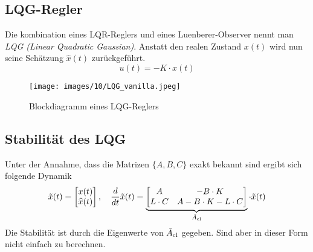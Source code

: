 \subsection{LQG-Regler}
    Die kombination eines LQR-Reglers und eines Luenberer-Observer nennt man \textit{LQG (Linear Quadratic Gaussian)}. Anstatt den realen Zustand $x(t)$ wird nun seine Schätzung $\widehat{x}(t)$ zurückgeführt.
    \begin{equation*}
        u(t) = -K\cdot\widehat{x}(t)
    \end{equation*}
    \begin{figure}[H]
        \centering
        \texttt{[image: images/10/LQG\_vanilla.jpeg]}
        \caption{Blockdiagramm eines LQG-Reglers}
    \end{figure}
    
    \noindent\begin{minipage}{\linewidth}
    \begin{center}
        
    \end{center}
    \end{minipage}
    
    
\subsection{Stabilität des LQG}
    Unter der Annahme, dass die Matrizen $\{A, B, C\}$ exakt bekannt sind ergibt sich folgende Dynamik
    \begin{equation*}
        \Tilde{x}(t) = \begin{bmatrix}x(t)\\\widehat{x}(t)\end{bmatrix},\quad
        \frac{d}{dt}\Tilde{x}(t) = 
        \underbrace{\begin{bmatrix}
        A   &   -B\cdot K\\
        L\cdot C & A-B\cdot K-L\cdot C
        \end{bmatrix}}_{\Tilde{A}_{\textnormal{cl}}}
        \cdot \Tilde{x}(t)
    \end{equation*}
    Die Stabilität ist durch die Eigenwerte von $\Tilde{A}_{\textnormal{cl}}$ gegeben. Sind aber in dieser Form nicht einfach zu berechnen.
    
